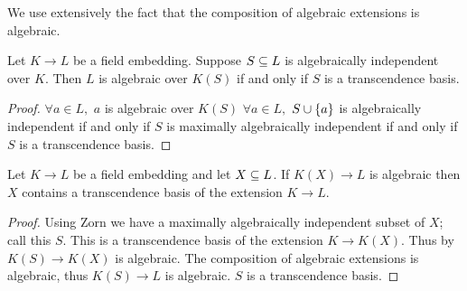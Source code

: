 \begin{lem}
    We use extensively the fact that the composition of 
    algebraic extensions is algebraic.
\end{lem}

\begin{prop}
    Let $K \to L$ be a field embedding.
    Suppose $S \subseteq L$ is algebraically independent over $K$.
    Then $L$ is algebraic over $K(S)$ if and only if 
    $S$ is a transcendence basis.
\end{prop}
\begin{proof}
    $\forall a \in L,$ $a$ is algebraic over $K(S)$
    $\forall a \in L,$ $S \cup \left\{a\right\}$ is algebraically independent
    if and only if $S$ is maximally algebraically independent
    if and only if $S$ is a transcendence basis.
\end{proof}

\begin{cor}
    Let $K \to L$ be a field embedding and let $X \subseteq L$.
    If $K(X) \to L$ is algebraic then $X$ contains a transcendence basis
    of the extension $K \to L$.
\end{cor}
\begin{proof}
    Using Zorn we have a maximally algebraically independent subset of $X$;
    call this $S$. 
    This is a transcendence basis of the extension $K \to K(X)$.
    Thus by  
    $K(S) \to K(X)$ is algebraic.
    The composition of algebraic extensions is algebraic,
    thus $K(S) \to L$ is algebraic.
    $S$ is a transcendence basis.
\end{proof}

